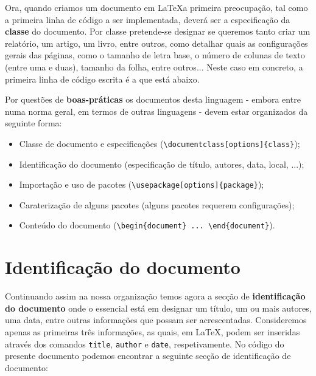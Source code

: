 \documentclass[a4paper, onecolumn, 10pt]{report}
\begin{document}
Ora, quando criamos um documento em \LaTeX a primeira preocupação, tal como a primeira linha de código a
ser implementada, deverá ser a especificação da \textbf{classe} do documento. Por classe pretende-se
designar se queremos tanto criar um relatório, um artigo, um livro, entre outros, como detalhar quais as
configurações gerais das páginas, como o tamanho de letra base, o número de colunas de texto (entre uma e duas),
tamanho da folha, entre outros... Neste caso em concreto, a primeira linha de código escrita é a que está abaixo.



Por questões de \textbf{boas-práticas} os documentos desta linguagem - embora entre numa norma geral, em termos de
outras linguagens - devem estar organizados da seguinte forma:

\begin{itemize}
    \item Classe de documento e especificações (\texttt{\textbackslash documentclass[options]\{class\}});
    \item Identificação do documento (especificação de título, autores, data, local, ...);
    \item Importação e uso de pacotes (\texttt{\textbackslash usepackage[options]\{package\}});
    \item Caraterização de alguns pacotes (alguns pacotes requerem configurações);
    \item Conteúdo do documento (\texttt{\textbackslash begin\{document\} ... \textbackslash end\{document\}}).
\end{itemize}

\section{Identificação do documento}

Continuando assim na nossa organização temos agora a secção de \textbf{identificação do documento} onde o essencial está
em designar um título, um ou mais autores, uma data, entre outras informações que possam ser acrescentadas. Consideremos apenas
as primeiras três informações, as quais, em \LaTeX, podem ser inseridas através dos comandos \texttt{title}, \texttt{author} e
\texttt{date}, respetivamente. No código do presente documento podemos encontrar a seguinte secção de identificação de documento:


\end{document}
